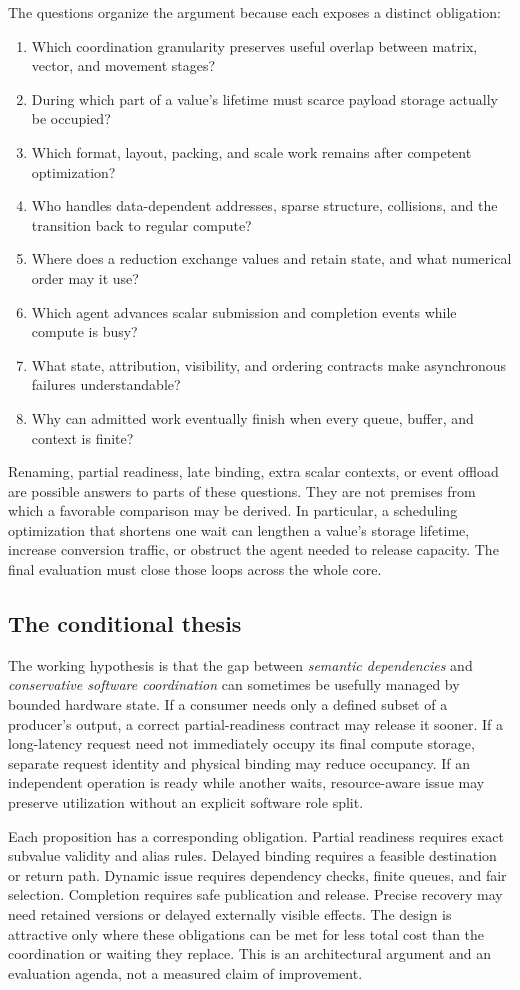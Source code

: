 The questions organize the argument because each exposes a distinct obligation:
\begin{enumerate}[label=\textbf{U00\arabic*},leftmargin=4.8em]
 \item Which coordination granularity preserves useful overlap between matrix, vector, and movement stages?
 \item During which part of a value's lifetime must scarce payload storage actually be occupied?
 \item Which format, layout, packing, and scale work remains after competent optimization?
 \item Who handles data-dependent addresses, sparse structure, collisions, and the transition back to regular compute?
 \item Where does a reduction exchange values and retain state, and what numerical order may it use?
 \item Which agent advances scalar submission and completion events while compute is busy?
 \item What state, attribution, visibility, and ordering contracts make asynchronous failures understandable?
 \item Why can admitted work eventually finish when every queue, buffer, and context is finite?
\end{enumerate}
Renaming, partial readiness, late binding, extra scalar contexts, or event offload are possible answers to parts of these questions. They are not premises from which a favorable comparison may be derived. In particular, a scheduling optimization that shortens one wait can lengthen a value's storage lifetime, increase conversion traffic, or obstruct the agent needed to release capacity. The final evaluation must close those loops across the whole core.

\subsection{The conditional thesis}

The working hypothesis is that the gap between \emph{semantic dependencies} and \emph{conservative software coordination} can sometimes be usefully managed by bounded hardware state. If a consumer needs only a defined subset of a producer's output, a correct partial-readiness contract may release it sooner. If a long-latency request need not immediately occupy its final compute storage, separate request identity and physical binding may reduce occupancy. If an independent operation is ready while another waits, resource-aware issue may preserve utilization without an explicit software role split.

Each proposition has a corresponding obligation. Partial readiness requires exact subvalue validity and alias rules. Delayed binding requires a feasible destination or return path. Dynamic issue requires dependency checks, finite queues, and fair selection. Completion requires safe publication and release. Precise recovery may need retained versions or delayed externally visible effects. The design is attractive only where these obligations can be met for less total cost than the coordination or waiting they replace. This is an architectural argument and an evaluation agenda, not a measured claim of improvement.
